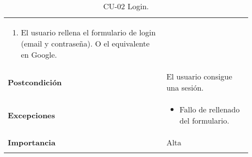 \begin{longtable}[H]{@{}ll@{}}
\begin{minipage}[t]{0.68\columnwidth}
\begin{enumerate}
\def\labelenumi{\arabic{enumi}.}
\tightlist
\item
  El usuario rellena el formulario de login (email y contraseña). O el equivalente en Google.
\end{enumerate}\strut
\end{minipage}\tabularnewline
\begin{minipage}[t]{0.26\columnwidth}\raggedright\strut
\textbf{Postcondición}\strut
\end{minipage} & \begin{minipage}[t]{0.68\columnwidth}\raggedright\strut%
El usuario consigue una sesión.\strut
\end{minipage}\tabularnewline
\begin{minipage}[t]{0.26\columnwidth}\raggedright\strut
\textbf{Excepciones}\strut
\end{minipage} & \begin{minipage}[t]{0.68\columnwidth}\raggedright\strut%
\begin{itemize}
\tightlist
\item
  Fallo de rellenado del formulario.
\end{itemize}\strut
\end{minipage}\tabularnewline
\begin{minipage}[t]{0.26\columnwidth}\raggedright\strut
\textbf{Importancia}\strut
\end{minipage} & \begin{minipage}[t]{0.68\columnwidth}\raggedright\strut%
Alta\strut
\end{minipage}\tabularnewline
\bottomrule%
\caption{CU-02 Login.}
\end{longtable}


